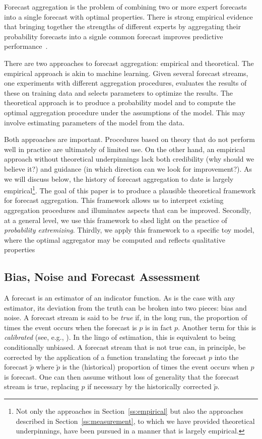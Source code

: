 \documentclass[11pt]{article}
\theoremstyle{definition}
\theoremstyle{definition}
\def\pt{\tilde{p}}
\begin{document}
Forecast aggregation is the problem of combining two or more 
expert forecasts into a single forecast with optimal properties.
There is strong empirical evidence that bringing together the
strengths of different experts by aggregating their probability 
forecasts into a signle common forecast improves predictive
performance~\citep{clemen1989combining, armstrong2001combining}.

There are two approaches to forecast aggregation: empirical
and theoretical.  The empirical approach is akin to machine
learning.  Given several forecast streams, one experiments
with different aggregation procedures, evaluates the results
of these on training data and selects parameters to optimize 
the results.  The theoretical approach is to produce a probability
model and to compute the optimal aggregation procedure under the 
assumptions of the model.  This may involve estimating parameters 
of the model from the data.  

Both approaches are important.  Procedures based on theory that
do not perform well in practice are ultimately of limited use.
On the other hand, an empirical approach without theoretical
underpinnings lack both credibility (why should we believe it?)
and guidance (in which direction can we look for improvement?).
As we will discuss below, the history of forecast aggregation
to date is largely empirical\footnote{Not only the approaches in
Section~\ref{ss:empirical} but also the approaches described in
Section~\ref{ss:measurement}, to which we have provided theoretical 
underpinnings, have been pursued in a manner that is largely empirical.}.  
The goal of this paper is to
produce a plausible theoretical framework for forecast aggregation.
This framework allows us to interpret existing aggregation 
procedures and illuminates aspects that can be improved.
Secondly, at a general level, we use this framework to shed light on 
the practice of {\em probability extremizing}.  Thirdly, we apply
this framework to a specific toy model, where the optimal 
aggregator may be computed and reflects qualitative properties 

\subsection{Bias, Noise and Forecast Assessment}

A forecast is an estimator of an indicator function.  As is
the case with any estimator, its deviation from the truth
can be broken into two pieces: bias and noise.  A forecast
stream is said to be {\em true}
if, in the long run, the proportion of times the event occurs 
when the forecast is $p$ is in fact $p$.  Another term for 
this is {\em calibrated} (see, e.g., \citealt{degroot1983comparison}). 
In the lingo of estimation, this is equivalent to being conditionally 
unbiased.  A forecast stream that is not true
can, in principle, be corrected by the application of a 
function translating the forecast $p$ into the forecast $\pt$
where $\pt$ is the (historical) proportion of times the 
event occurs when $p$ is forecast.  One can then assume without
loss of generality that the forecast stream is true, replacing
$p$ if necessary by the historically corrected $\pt$.
\end{document}
